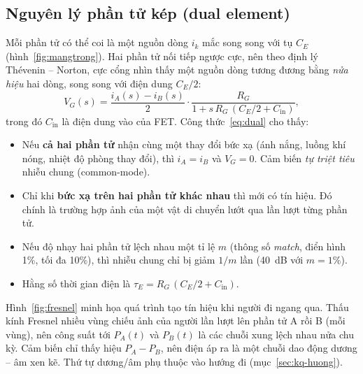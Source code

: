 \subsection{Nguyên lý phần tử kép (dual element)}
\label{sec:dual}

Mỗi phần tử có thể coi là một nguồn dòng $i_k$ mắc song song với tụ $C_E$ (hình~\ref{fig:mangtrong}). Hai phần tử nối tiếp ngược cực, nên theo định lý Thévenin -- Norton, cực cổng nhìn thấy một nguồn dòng tương đương bằng \emph{nửa hiệu} hai dòng, song song với điện dung $C_E/2$:
\begin{equation}
  V_G(s) = \frac{i_A(s) - i_B(s)}{2}\cdot\frac{R_G}{1+s\,R_G\,(C_E/2 + C_\text{in})},
  \label{eq:dual}
\end{equation}
trong đó $C_\text{in}$ là điện dung vào của FET. Công thức~\eqref{eq:dual} cho thấy:
\begin{itemize}
  \item Nếu \textbf{cả hai phần tử} nhận cùng một thay đổi bức xạ (ánh nắng, luồng khí nóng, nhiệt độ phòng thay đổi), thì $i_A = i_B$ và $V_G = 0$. Cảm biến \emph{tự triệt tiêu} nhiễu chung (common-mode).
  \item Chỉ khi \textbf{bức xạ trên hai phần tử khác nhau} thì mới có tín hiệu. Đó chính là trường hợp ảnh của một vật di chuyển lướt qua lần lượt từng phần tử.
  \item Nếu độ nhạy hai phần tử lệch nhau một tỉ lệ $m$ (thông số \emph{match}, điển hình 1\%, tối đa 10\%), thì nhiễu chung chỉ bị giảm $1/m$ lần (40~dB với $m = 1\%$).
  \item Hằng số thời gian điện là $\tau_E = R_G\,(C_E/2 + C_\text{in})$.
\end{itemize}

Hình~\ref{fig:fresnel} minh họa quá trình tạo tín hiệu khi người đi ngang qua. Thấu kính Fresnel nhiều vùng chiếu ảnh của người lần lượt lên phần tử A rồi B (mỗi vùng), nên công suất tới $P_A(t)$ và $P_B(t)$ là các chuỗi xung lệch nhau nửa chu kỳ. Cảm biến chỉ thấy hiệu $P_A - P_B$, nên điện áp ra là một chuỗi dao động dương -- âm xen kẽ. Thứ tự dương/âm phụ thuộc vào hướng đi (mục~\ref{sec:kq-huong}).

